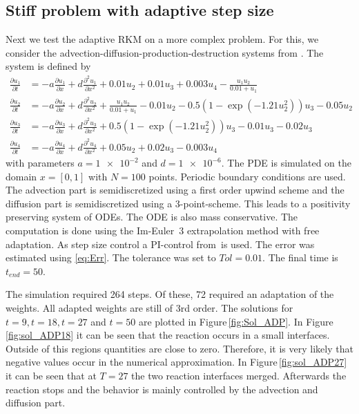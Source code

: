 \documentclass[a4paper]{article}
\numberwithin{equation}{section}
\theoremstyle{plain}
\theoremstyle{definition}
\numberwithin{theorem}{section}
\newcommand{\1}{\mathbbm{1}}
\begin{document}
\subsection{Stiff problem with adaptive step size}

Next we test the adaptive RKM on a more complex problem. 
For this, we consider the advection-diffusion-production-destruction systems from \cite{kopecz_comparison_2019}. The system is defined by
\begin{subequations}
\label{eq:ADR}
\begin{align}
\frac{\partial u_1}{\partial t} &=-a \frac{\partial u_1}{\partial x} + d\frac{\partial^2 u_1}{\partial x ^2} + 0.01u_2 + 0.01 u_3 +0.003u_4 - \frac{u_1 u_2}{0.01+u_1} \\ 
\frac{\partial u_2}{\partial t} &=-a \frac{\partial u_2}{\partial x} + d\frac{\partial^2 u_2}{\partial x ^2} + \frac{u_1u_2}{0.01+u_1} -0.01 u_2-0.5(1-\exp(-1.21 u_2^2)) u_3 -0.05 u_2 \\ 
\frac{\partial u_3}{\partial t} &=-a \frac{\partial u_3}{\partial x} + d\frac{\partial^2 u_3}{\partial x ^2} + 0.5(1-\exp(-1.21u_2^2)) u_3 - 0.01 u_3 -0.02 u_3 \\ 
\frac{\partial u_4}{\partial t} &=-a \frac{\partial u_4}{\partial x} + d\frac{\partial^2 u_4}{\partial x ^2} + 0.05 u_2 + 0.02 u_3 - 0.003u_4 
\end{align}
\end{subequations}
with parameters $a=\num{1e-2} $ and $ d=\num{1e-6}$.
The PDE is simulated on the domain $x = [0,1]$ with $N=100$ points. Periodic boundary conditions are used. 
The advection part is semidiscretized using a first order upwind scheme and the diffusion part is semidiscretized using a 3-point-scheme. This leads to a positivity preserving system of ODEs.
The ODE is also mass conservative.
The computation is done using the Im-Euler~3 extrapolation
method with free adaptation.
As step size control a PI-control from\,\cite{hairer_solving_1996} is used. The error was estimated using \eqref{eq:Err}. The tolerance was set to $Tol = 0.01$.
The final time is $t_{end} = 50$.

The simulation required 264 steps. Of these, 72 required an adaptation of the weights. 
All adapted weights are still of 3rd order.
The solutions for $t=9,t=18,t=27$ and $t=50$ are plotted in Figure\,\ref{fig:Sol_ADP}. 
In Figure\,\ref{fig:sol_ADP18} it can be seen that the reaction occurs in a small interfaces. 
Outside of this regions quantities are close to zero. Therefore, it is very likely that negative values occur in the numerical approximation.
In Figure\,\ref{fig:sol_ADP27} it can be seen that at $T=27$ the two reaction interfaces merged. Afterwards the reaction stops and the behavior is mainly controlled by the advection and diffusion part.  
\end{document}
